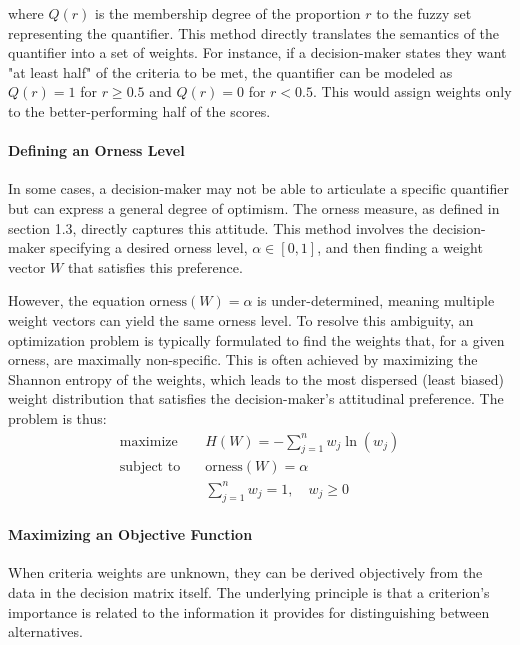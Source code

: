 where $Q(r)$ is the membership degree of the proportion $r$ to the fuzzy set representing the quantifier. This method directly translates the semantics of the quantifier into a set of weights. For instance, if a decision-maker states they want "at least half" of the criteria to be met, the quantifier can be modeled as $Q(r) = 1$ for $r \geq 0.5$ and $Q(r)=0$ for $r < 0.5$. This would assign weights only to the better-performing half of the scores.

\paragraph{Defining an Orness Level}
In some cases, a decision-maker may not be able to articulate a specific quantifier but can express a general degree of optimism. The orness measure, as defined in section 1.3, directly captures this attitude. This method involves the decision-maker specifying a desired orness level, $\alpha \in [0,1]$, and then finding a weight vector $W$ that satisfies this preference.

However, the equation $\text{orness}(W) = \alpha$ is under-determined, meaning multiple weight vectors can yield the same orness level. To resolve this ambiguity, an optimization problem is typically formulated to find the weights that, for a given orness, are maximally non-specific. This is often achieved by maximizing the Shannon entropy of the weights, which leads to the most dispersed (least biased) weight distribution that satisfies the decision-maker's attitudinal preference. The problem is thus:
\begin{align*}
    \text{maximize} \quad & H(W) = -\sum_{j=1}^{n} w_j \ln(w_j) \\
    \text{subject to} \quad & \text{orness}(W) = \alpha \\
    & \sum_{j=1}^{n} w_j = 1, \quad w_j \ge 0
\end{align*}

\paragraph{Maximizing an Objective Function}
When criteria weights are unknown, they can be derived objectively from the data in the decision matrix itself. The underlying principle is that a criterion's importance is related to the information it provides for distinguishing between alternatives.

